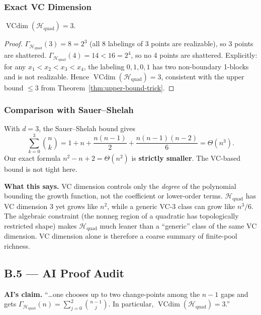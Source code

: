 \documentclass{article}
\begin{document}
\subsubsection{Exact VC Dimension}
 
\begin{summarybox}
$\operatorname{VCdim}(\mathcal{H}_{\mathrm{quad}})=3$.
\end{summarybox}
 
\begin{proof}
$\Gamma_{\mathcal{H}_{\mathrm{quad}}}(3)=8=2^3$ (all 8 labelings of 3
points are realizable), so 3 points are shattered.
$\Gamma_{\mathcal{H}_{\mathrm{quad}}}(4)=14<16=2^4$, so no 4 points are
shattered.
Explicitly: for any $x_1<x_2<x_3<x_4$, the labeling $0,1,0,1$ has two
non-boundary 1-blocks and is not realizable.
Hence $\operatorname{VCdim}(\mathcal{H}_{\mathrm{quad}})=3$,
consistent with the upper bound $\le3$ from Theorem~\ref{thm:upper-bound-trick}.
\end{proof}
 
\subsubsection{Comparison with Sauer--Shelah}
 
With $d=3$, the Sauer--Shelah bound gives
\[
  \sum_{k=0}^{3}\binom{n}{k}
  = 1+n+\frac{n(n-1)}{2}+\frac{n(n-1)(n-2)}{6}
  = \Theta(n^3).
\]
Our exact formula $n^2-n+2=\Theta(n^2)$ is \textbf{strictly smaller}.
The VC-based bound is not tight here.
 
\textbf{What this says.}
VC dimension controls only the \emph{degree} of the polynomial bounding
the growth function, not the coefficient or lower-order terms.
$\mathcal{H}_{\mathrm{quad}}$ has VC dimension 3 yet grows like $n^2$, while a
generic VC-3 class can grow like $n^3/6$.
The algebraic constraint (the nonneg region of a quadratic has
topologically restricted shape) makes $\mathcal{H}_{\mathrm{quad}}$ much
leaner than a ``generic'' class of the same VC dimension.
VC dimension alone is therefore a coarse summary of finite-pool richness.
 
\subsection{B.5 --- AI Proof Audit}
 
\begin{notebox}
\textbf{AI's claim.}
``\ldots one chooses up to two change-points among the $n-1$ gaps and
gets $\Gamma_{\mathcal{H}_{\mathrm{quad}}}(n)=\sum_{j=0}^{2}\binom{n-1}{j}$.
In particular, $\operatorname{VCdim}(\mathcal{H}_{\mathrm{quad}})=3$.''
\end{notebox}
 
\end{document}
